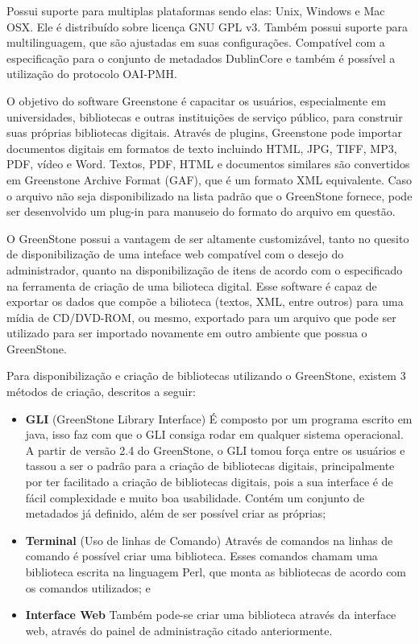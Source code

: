 Possui suporte para multiplas plataformas sendo elas: Unix, Windows e Mac OSX. Ele é distribuído sobre licença GNU GPL v3. Também possui suporte para multilinguagem, que são ajustadas em suas configurações. Compatível com a especificação para o conjunto de metadados DublinCore e também é possível a utilização do protocolo OAI-PMH.

O objetivo do software Greenstone é capacitar os usuários, especialmente em universidades, bibliotecas e outras instituições de serviço público, para construir suas próprias bibliotecas digitais. Através de plugins, Greenstone pode importar documentos digitais em formatos de texto incluindo HTML, JPG, TIFF, MP3, PDF, vídeo e Word. Textos, PDF, HTML e documentos similares são convertidos em Greenstone Archive Format (GAF), que é um formato XML equivalente. Caso o arquivo não seja disponibilizado na lista padrão que o GreenStone fornece, pode ser desenvolvido um plug-in para manuseio do formato do arquivo em questão.

O GreenStone possui a vantagem de ser altamente customizável, tanto no quesito de disponibilização de uma inteface web compatível com o desejo do administrador, quanto na disponibilização de itens de acordo com o especificado na ferramenta de criação de uma bilioteca digital. Esse software é capaz de exportar os dados que compõe a bilioteca (textos, XML, entre outros) para uma mídia de CD/DVD-ROM, ou mesmo, exportado para um arquivo que pode ser utilizado para ser importado novamente em outro ambiente que possua o GreenStone.

Para disponibilização e criação de bibliotecas utilizando o GreenStone, existem 3 métodos de criação, descritos a seguir:

\begin{itemize}
  \item \textbf{GLI} (GreenStone Library Interface) É composto por um programa escrito em java, isso faz com que o GLI consiga rodar em qualquer sistema operacional.  A partir de versão 2.4 do GreenStone, o GLI tomou força entre os usuários e tassou a ser o padrão para a criação de bibliotecas digitais, principalmente por ter facilitado a criação de bibliotecas digitais, pois a sua interface é de fácil complexidade e muito boa usabilidade. Contém um conjunto de metadados já definido, além de ser possível criar as próprias;
  \item \textbf{Terminal} (Uso de linhas de Comando) Através de comandos na linhas de comando é possível criar uma biblioteca. Esses comandos chamam uma biblioteca escrita na linguagem Perl, que monta as bibliotecas de acordo com os comandos utilizados; e
  \item \textbf{Interface Web} Também pode-se criar uma biblioteca através da interface web, através do painel de administração citado anteriormente.
\end{itemize}

